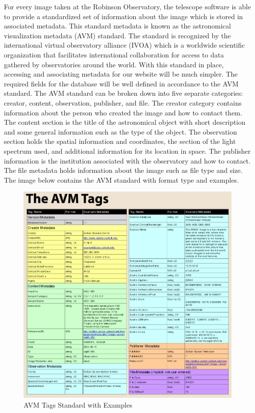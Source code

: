 \documentclass[12pt]{report}
\begin{document}
For every image taken at the Robinson Observatory, the telescope software is able to provide a standardized set of information about the image which is stored in associated metadata.  This standard metadata is known as the astronomical visualization metadata (AVM) standard.  The standard is recognized by the international virtual observatory alliance (IVOA) which is a worldwide scientific organization that facilitates international collaboration for access to data gathered by observatories around the world.  With this standard in place, accessing and associating metadata for our website will be much simpler.  The required fields for the database will be well defined in accordance to the AVM standard.
The AVM standard can be broken down into five separate categories: creator, content, observation, publisher, and file.  The creator category contains information about the person who created the image and how to contact them.  The content section is the title of the astronomical object with short description and some general information such as the type of the object.  The observation section holds the spatial information and coordinates, the section of the light spectrum used, and additional information for its location in space.  The publisher information is the institution associated with the observatory and how to contact.  The file metadata holds information about the image such as file type and size.
The image below contains the AVM standard with format type and examples.

\newpage

\begin{figure}[h]
	\centering
	\includegraphics[width=\linewidth]{avm_standards}
	\caption{AVM Tags Standard with Examples}
	\label{fig:AVM Standards}
\end{figure}
\end{document}

